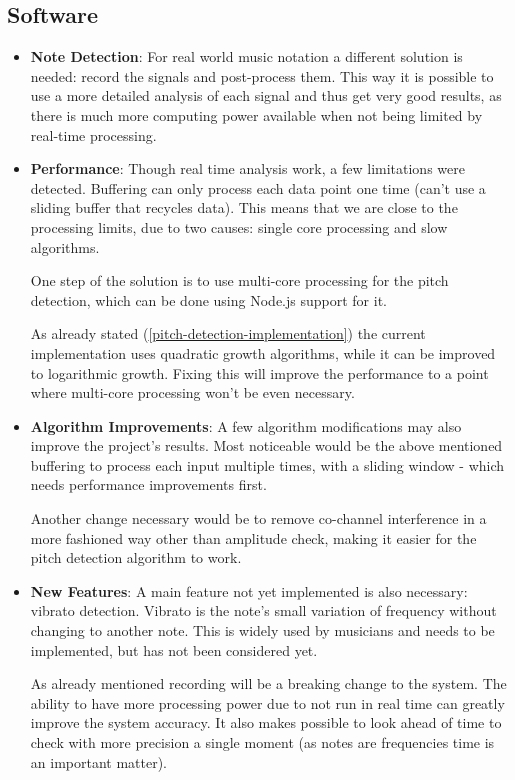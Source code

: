 \subsection{Software}
\begin{itemize}
  \item \textbf{Note Detection}: For real world music notation a different solution is needed: record the signals
  and post-process them. This way it is possible to use a more detailed analysis
  of each signal and thus get very good results, as there is much more computing
  power available when not being limited by real-time processing.  
  \item \textbf{Performance}: Though real time analysis work, a few limitations were detected. Buffering can only
  process each data point one time (can't use a sliding buffer that recycles data).
  This means that we are close to the processing limits, due to two causes: single
  core processing and slow algorithms. 
  
  One step of the solution is to use multi-core processing for the pitch detection,
  which can be done using Node.js support for it. 
  
  As already stated (\autoref{pitch-detection-implementation}) the current implementation
  uses quadratic growth algorithms, while it can be improved to logarithmic
  growth. Fixing this will improve the performance to a point where multi-core processing
  won't be even necessary.
  \item \textbf{Algorithm Improvements}: A few algorithm modifications may also improve the project's results. Most noticeable
  would be the above mentioned buffering to process each input multiple times, with a
  sliding window - which needs performance improvements first.
  
  Another change necessary would be to remove co-channel interference in a more fashioned
  way other than amplitude check, making it easier for the pitch detection algorithm to work.
  
  \item \textbf{New Features}: A main feature not yet implemented is also necessary: vibrato detection. Vibrato is the
  note's small variation of frequency without changing to another note. This is widely used
  by musicians and needs to be implemented, but has not been considered yet.
  
  As already mentioned recording will be a breaking change to the system. The ability to have
  more processing power due to not run in real time can greatly improve the system accuracy.
  It also makes possible to look ahead of time to check with more precision a single moment
  (as notes are frequencies time is an important matter).  
\end{itemize}
